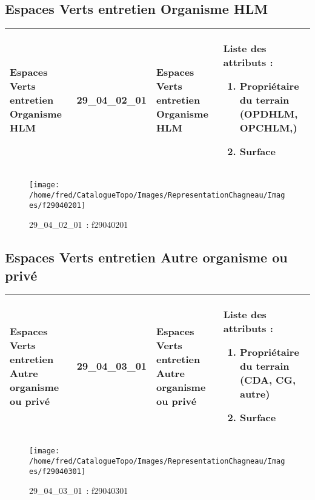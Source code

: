 \documentclass[12pt,titlepage]{book}
\begin{document}
\subsection{Espaces Verts entretien Organisme HLM}
\noindent
\vspace{\baselineskip}

\renewcommand{\arraystretch}{1.2}
\begin{supertabular}{|p{10cm}|c|p{13cm}|p{12cm}|}
 Espaces Verts entretien Organisme HLM & 29\_04\_02\_01 & Espaces Verts entretien Organisme HLM & Liste des attributs :
\begin{enumerate}
  \item Propriétaire du terrain (OPDHLM, OPCHLM,)  \item Surface\end{enumerate}
\\
\hline
\end{supertabular}
\begin{figure}[h!]
  \hfill         %
  \begin{minipage}[t]{3cm}
    \begin{center}
      \texttt{[image: /home/fred/CatalogueTopo/Images/RepresentationChagneau/Images/f29040201]}
      \caption[~29\_04\_02\_01]{\small{29\_04\_02\_01~:} \tiny{f29040201}}\label{f29040201}
    \end{center}
  \end{minipage}
\end{figure}


\subsection{Espaces Verts entretien Autre organisme ou privé}
\noindent
\vspace{\baselineskip}

\renewcommand{\arraystretch}{1.2}
\begin{supertabular}{|p{10cm}|c|p{13cm}|p{12cm}|}
 Espaces Verts entretien Autre organisme ou privé & 29\_04\_03\_01 & Espaces Verts entretien Autre organisme ou privé & Liste des attributs :
\begin{enumerate}
  \item Propriétaire du terrain (CDA, CG, autre)  \item Surface\end{enumerate}
\\
\hline
\end{supertabular}
\begin{figure}[h!]
  \hfill         %
  \begin{minipage}[t]{3cm}
    \begin{center}
      \texttt{[image: /home/fred/CatalogueTopo/Images/RepresentationChagneau/Images/f29040301]}
      \caption[~29\_04\_03\_01]{\small{29\_04\_03\_01~:} \tiny{f29040301}}\label{f29040301}
    \end{center}
  \end{minipage}
\end{figure}
\end{document}
